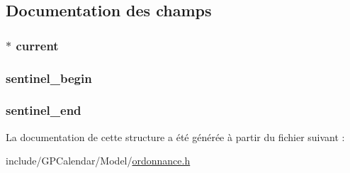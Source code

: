 \subsection{Documentation des champs}
\hypertarget{struct_list_ordonnance_a1cf97af157701a64fc159222fd9b473b}{
\subsubsection[{current}]{$\ast$ current}}\label{struct_list_ordonnance_a1cf97af157701a64fc159222fd9b473b}
\hypertarget{struct_list_ordonnance_a364d17b110f618a202d1e1d49f0d7ca8}{
\subsubsection[{sentinel\-\_\-begin}]{ sentinel\-\_\-begin}}\label{struct_list_ordonnance_a364d17b110f618a202d1e1d49f0d7ca8}
\hypertarget{struct_list_ordonnance_a5ca6db7384d3a5276609a826a5576204}{
\subsubsection[{sentinel\-\_\-end}]{ sentinel\-\_\-end}}\label{struct_list_ordonnance_a5ca6db7384d3a5276609a826a5576204}


La documentation de cette structure a été générée à partir du fichier suivant \-:\begin{DoxyCompactItemize}
\item 
include/\-G\-P\-Calendar/\-Model/\hyperlink{ordonnance_8h}{ordonnance.\-h}\end{DoxyCompactItemize}
